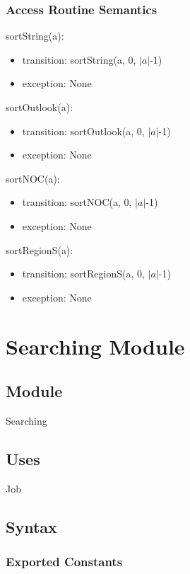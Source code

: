 \documentclass[12pt]{article}
\begin{document}
\subsubsection* {Access Routine Semantics}

\noindent sortString(a):
\begin{itemize}
\item transition: sortString(a, 0, $|a|$-1)
\item exception: None
\end{itemize}

\noindent sortOutlook(a):
\begin{itemize}
\item transition: sortOutlook(a, 0, $|a|$-1)
\item exception: None
\end{itemize}

\noindent sortNOC(a):
\begin{itemize}
\item transition: sortNOC(a, 0, $|a|$-1)
\item exception: None
\end{itemize}

\noindent sortRegionS(a):
\begin{itemize}
\item transition: sortRegionS(a, 0, $|a|$-1)
\item exception: None
\end{itemize}

\newpage

\section* {Searching Module}
\subsection*{Module}

Searching

\subsection* {Uses}

Job

\subsection* {Syntax}
\subsubsection* {Exported Constants}
\end{document}
